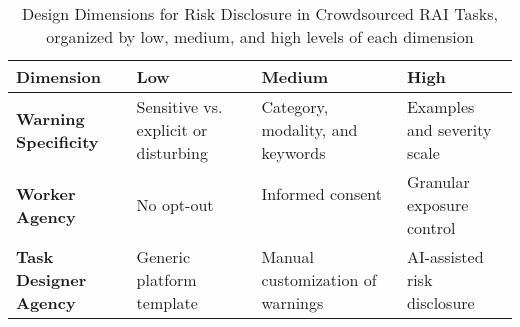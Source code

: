 \begin{table*}[t]
\centering
\begin{tabular}{p{3cm} p{4cm} p{4cm} p{4cm}}
\toprule
\textbf{Dimension} & \textbf{Low} & \textbf{Medium} & \textbf{High} \\
\midrule
\textbf{Warning Specificity} & 
Sensitive vs. explicit or disturbing ~\cite{prolific2025sensitive, bell2025warning} & 
Category, modality, and keywords ~\cite{jhaver2023personalizing, bridgland2024meta} & 
Examples and severity scale ~\cite{jhaver2023personalizing}\\
\midrule
\textbf{Worker Agency} & 
No opt-out ~\cite{MTurkTutorial2017} &
Informed consent ~\cite{silberman2018responsible, ProlificParticipantSensitive2025} & 
Granular exposure control ~\cite{jhaver2023personalizing, jhaver2022designing} \\
\midrule
\textbf{Task Designer Agency} & 
Generic platform template ~\cite{prolific2025sensitive, ProlificAPIContentWarning2025} & 
Manual customization of warnings ~\cite{qian2025locating}& 
AI-assisted risk disclosure ~\cite{qian2025aura} \\
\bottomrule
\end{tabular}
\caption{Design Dimensions for Risk Disclosure in Crowdsourced RAI Tasks, organized by low, medium, and high levels of each dimension}
\label{tab:design_dimensions_levels}
\end{table*}



